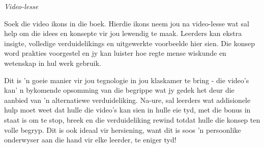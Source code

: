\newpage
\thispagestyle{empty}

{\normalfont\sffamily\fontsize{22}\normalfont\itshape Video-lesse} \par

{\Large
% 
% 
Soek die video ikons in die boek. Hierdie ikons neem jou na video-lesse wat sal help om die idees en konsepte vir jou lewendig te maak. Leerders kan ekstra insigte, volledige verduidelikings en uitgewerkte voorbeelde hier sien. Die konsep word prakties voorgestel en jy kan luister hoe regte mense wiskunde en wetenskap in hul werk gebruik. \par

Dit is 'n goeie manier vir jou tegnologie in jou klaskamer te bring - die video's kan' n bykomende opsomming van die begrippe wat jy gedek het deur die aanbied van 'n alternatiewe verduideliking. Na-ure, sal leerders wat addisionele hulp moet weet dat hulle die video's kan sien in hulle eie tyd, met die bonus in staat is om te stop, breek en die verduideliking rewind totdat hulle die konsep ten volle begryp. Dit is ook ideaal vir hersiening, want dit is soos 'n persoonlike onderwyser aan die hand vir elke leerder, te eniger tyd!\par

}
